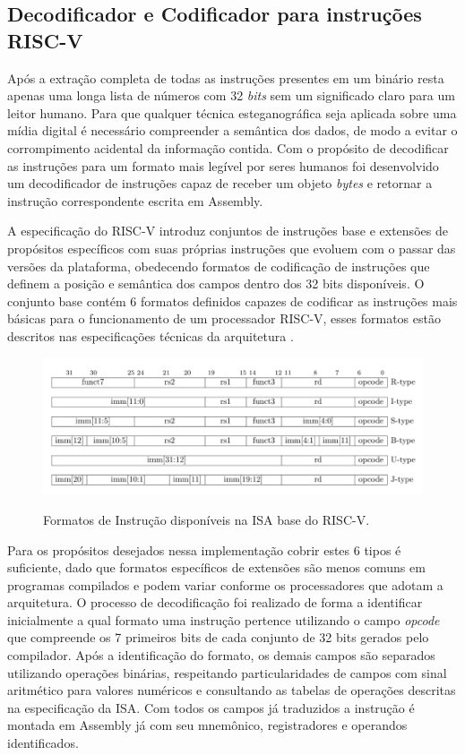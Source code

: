 
\subsection{Decodificador e Codificador  para instruções RISC-V}

Após a extração completa de todas as instruções presentes em um binário resta apenas uma longa lista de números com 32 \textit{bits} sem um significado claro para um leitor humano. Para que qualquer técnica esteganográfica seja aplicada sobre uma mídia digital é necessário compreender a semântica dos dados, de modo a evitar o corrompimento acidental da informação contida. Com o propósito de decodificar as instruções para um formato mais legível por seres humanos foi desenvolvido um decodificador de instruções capaz de receber um objeto \textit{bytes} e retornar a instrução correspondente escrita em Assembly.

A especificação do RISC-V introduz conjuntos de instruções base e extensões de propósitos específicos com suas próprias instruções que evoluem com o passar das versões da plataforma, obedecendo formatos de codificação de instruções que definem a posição e semântica dos campos dentro dos 32 bits disponíveis. O conjunto base contém 6 formatos definidos capazes de codificar as instruções mais básicas para o funcionamento de um processador RISC-V, esses formatos estão descritos nas especificações técnicas da arquitetura \cite{riscv_manual_vol1}. 

\begin{figure}[!htb]
     \centering
     \caption{Formatos de Instrução disponíveis na ISA base do RISC-V.}
     \includegraphics[width=13cm]{images/TCC3.png}
     \label{}
\end{figure}

Para os propósitos desejados nessa implementação cobrir estes 6 tipos é suficiente, dado que formatos específicos de extensões são menos comuns em programas compilados e podem variar conforme os processadores que adotam a arquitetura. O processo de decodificação foi realizado de forma a identificar inicialmente a qual formato uma instrução pertence utilizando o campo \textit{opcode} que compreende os 7 primeiros bits de cada conjunto de 32 bits gerados pelo compilador. Após a identificação do formato, os demais campos são separados utilizando operações binárias, respeitando particularidades de campos com sinal aritmético para valores numéricos e consultando as tabelas de operações descritas na especificação da ISA. Com todos os campos já traduzidos a instrução é montada em Assembly já com seu mnemônico, registradores e operandos identificados. 

